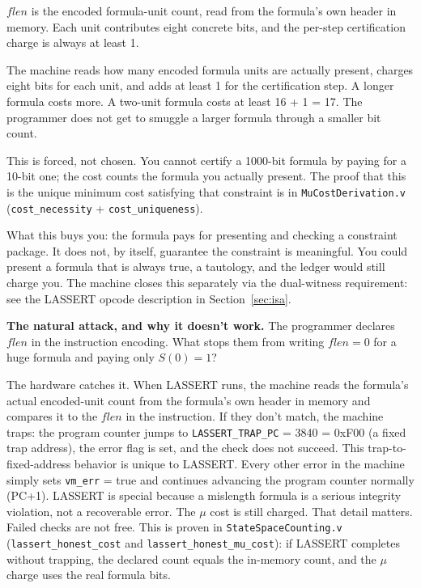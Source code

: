 \documentclass[11pt,a4paper]{article}
\theoremstyle{plain}
\theoremstyle{definition}
\theoremstyle{remark}
\begin{document}
$\mathit{flen}$ is the encoded formula-unit count, read from the formula's own header in memory. Each unit contributes eight concrete bits, and the per-step certification charge is always at least 1.

The machine reads how many encoded formula units are actually present, charges eight bits for each unit, and adds at least 1 for the certification step. A longer formula costs more. A two-unit formula costs at least 16 + 1 = 17. The programmer does not get to smuggle a larger formula through a smaller bit count.

This is forced, not chosen. You cannot certify a 1000-bit formula by paying for a 10-bit one; the cost counts the formula you actually present. The proof that this is the unique minimum cost satisfying that constraint is in \texttt{MuCostDerivation.v} (\texttt{cost\_necessity} + \texttt{cost\_uniqueness}).

What this buys you: the formula pays for presenting and checking a constraint package. It does not, by itself, guarantee the constraint is meaningful. You could present a formula that is always true, a tautology, and the ledger would still charge you. The machine closes this separately via the dual-witness requirement: see the LASSERT opcode description in Section~\ref{sec:isa}.

\textbf{The natural attack, and why it doesn't work.} The programmer declares $\mathit{flen}$ in the instruction encoding. What stops them from writing $\mathit{flen} = 0$ for a huge formula and paying only $S(0) = 1$?

The hardware catches it. When LASSERT runs, the machine reads the formula's actual encoded-unit count from the formula's own header in memory and compares it to the $\mathit{flen}$ in the instruction. If they don't match, the machine traps: the program counter jumps to \texttt{LASSERT\_TRAP\_PC} = 3840 = 0xF00 (a fixed trap address), the error flag is set, and the check does not succeed. This trap-to-fixed-address behavior is unique to LASSERT. Every other error in the machine simply sets \texttt{vm\_err} = true and continues advancing the program counter normally (PC+1). LASSERT is special because a mislength formula is a serious integrity violation, not a recoverable error. The $\mu$ cost is still charged. That detail matters. Failed checks are not free. This is proven in \texttt{StateSpaceCounting.v} (\texttt{lassert\_honest\_cost} and \texttt{lassert\_honest\_mu\_cost}): if LASSERT completes without trapping, the declared count equals the in-memory count, and the $\mu$ charge uses the real formula bits.
\end{document}
